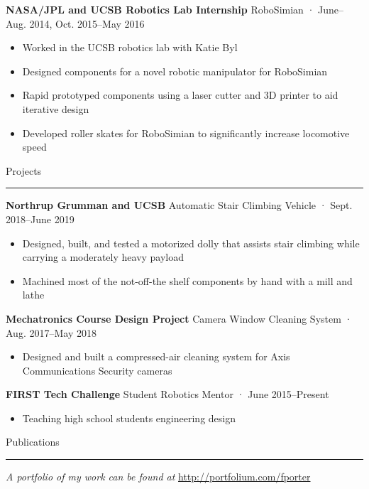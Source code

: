 \documentclass[12pt, oneside]{article}
\newcommand{\headingstyleJobs}[1] {
	{\fontsize{19pt}{1em}\selectfont \textcolor{new_red}{\textsf{#1}}}
	\textcolor{new_red}{\rule{3.25in}{0.5pt}} \vspace{3pt}
}
\newcommand{\jobtitle}[3] {
	{\bf #1} {#2} · {#3} \vspace{-10pt} \\
}
\begin{document}
\begin{flushleft}
\jobtitle{NASA/JPL and UCSB Robotics Lab Internship}{RoboSimian}{June–Aug. 2014, Oct. 2015–May 2016}
\begin{itemize}
	\item Worked in the UCSB robotics lab with Katie Byl
	\item Designed components for a novel robotic manipulator for RoboSimian
	\item Rapid prototyped components using a laser cutter and 3D printer to aid iterative design
	\item Developed roller skates for RoboSimian to significantly increase locomotive speed 
\end{itemize}


\headingstyleJobs{Projects}

\jobtitle{Northrup Grumman and UCSB}{Automatic Stair Climbing Vehicle}{Sept. 2018–June 2019}
\begin{itemize}
	\item Designed, built, and tested a motorized dolly that assists stair climbing while carrying a moderately heavy payload
	\item Machined most of the not-off-the shelf components by hand with a mill and lathe
\end{itemize}

\jobtitle{Mechatronics Course Design Project}{Camera Window Cleaning System}{Aug. 2017–May 2018}
\begin{itemize}
	\item Designed and built a compressed-air cleaning system for Axis Communications Security cameras 
\end{itemize}

\jobtitle{FIRST Tech Challenge}{Student Robotics Mentor}{June 2015–Present}
\begin{itemize}
	\item Teaching high school students engineering design
\end{itemize}




\headingstyleJobs{Publications}

\vspace{-9pt}
\nocite{OWMS-DSA}




\textit{A portfolio of my work can be found at} \url{http://portfolium.com/fporter}

\end{flushleft}
\end{document}
